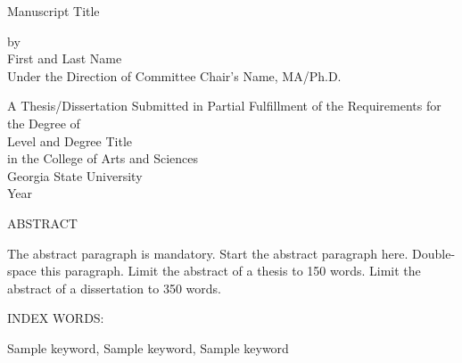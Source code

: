 \pagestyle{empty}
\begin{center}
Manuscript Title %


\vspace{1.4in}
by\\
\vspace{1.4in}
First and Last Name\\ %
\vspace{1.4in}
Under the Direction of Committee Chair's Name, MA/Ph.D. \\ %
\vspace{1.4in}

A Thesis/Dissertation Submitted in Partial Fulfillment of the Requirements for the Degree of\\  %
\vspace{.2in}
Level and Degree Title \\ %
\vspace{.2in}
in the College of Arts and Sciences \\
\vspace{.2in}
Georgia State University \\
\vspace{.2in}
Year %

\pagebreak 


ABSTRACT\\ 

\end{center}

\doublespacing
The abstract paragraph is mandatory. Start the abstract paragraph here. Double-space this paragraph. Limit the abstract of a thesis to 150 words. Limit the abstract of a dissertation to 350 words.


\begin{singlespace}
\vfill   
\vspace{0.5in}
\noindent INDEX WORDS:
\hspace{0.0in}
\parbox[t]{4.5in}{
Sample keyword, Sample keyword, Sample keyword}  %


\end{singlespace} 